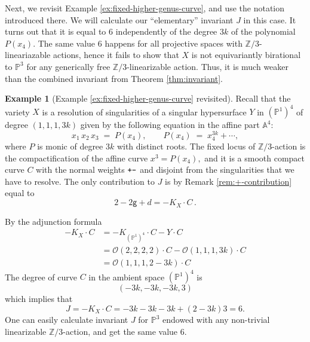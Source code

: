 \documentclass[12pt,a4paper]{amsart}
\theoremstyle{definition}
\newtheorem{example}[theorem]{Example}
\theoremstyle{remark}
\newcommand{\Z}{\mathbb{Z}}
\newcommand{\lp}{\textup{\texttt{+}}}
\newcommand{\lm}{\textup{\texttt{-}}}
\begin{document}
Next, we revisit Example \ref{ex:fixed-higher-genus-curve}, and use the notation introduced there. We will calculate our ``elementary'' invariant $J$ in this case. It turns out that it is equal to $6$ independently of the degree $3k$ of the polynomial $P(x_4)$. The same value $6$ happens for all projective spaces with $\mathbb Z/3$-lineariazable actions, hence it fails to show that $X$ is not equivariantly birational to $\mathbb P^3$ for any generically free $\mathbb Z/3$-linearizable action. Thus, it is much weaker than the combined invariant from Theorem \ref{thm:invariant}.
    \begin{example}[Example \ref{ex:fixed-higher-genus-curve} revisited]\label{ex:fixed-higher-genus-curve-revisited}
Recall that the variety $X$ is a resolution of singularities of a singular hypersurface $Y$ in $(\mathbb P^1)^4$ of degree $(1,1,1,3k)$ given by the following equation in the affine part $\mathbb A^4$:
\[
  x_{1}\,x_{2}\,x_{3} \;=\; P(x_{4}), 
  \qquad
  P(x_{4}) \;=\; x_{4}^{3k} + \cdots,
\]
where $P$ is monic of degree $3k$ with distinct roots.   The fixed locus of $\Z/3$-action  is  the compactification of the affine curve
\(
  x^{3} = P(x_{4}),
\)
and it is a smooth compact curve $C$ with the normal weights $\lp\lm$ and disjoint from the singularities that we have to resolve. The only contribution to $J$ is by Remark \ref{rem:+-contribution} equal to 
\[2-2\mathsf g+d=-K_X\cdot C\,.\]


By the adjunction formula
\begin{align}-K_X\cdot C&=-K_{(\mathbb P^1)^4}\cdot C-Y\cdot C\\&= \mathcal O(2,2,2,2)\cdot C-\mathcal O(1,1,1,3k)\cdot C\\
&=\mathcal O(1,1,1,2-3k)\cdot C\end{align}
The degree of curve $C$ in the ambient space $(\mathbb P^1)^4$ is
   \[(-3k,-3k,-3k,3)\]
   which implies that
   \[J=-K_X\cdot C =-3k-3k-3k+(2-3k)3=6.\]
   One can easily calculate invariant $J$ for $\mathbb P^3$ endowed with any non-trivial linearizable $\Z/3$-action, and get the same value $6$.
\end{example}
\end{document}
